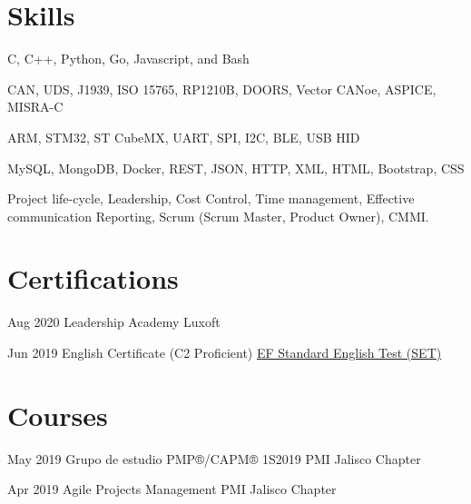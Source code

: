 \documentclass[10pt, letterpaper]{article} %
\begin{document}

\section{Skills}

{C, C++, Python, Go, Javascript, and Bash}
{}


{CAN, UDS, J1939, ISO 15765, RP1210B, DOORS, Vector CANoe, ASPICE, MISRA-C}
{}


{ARM, STM32, ST CubeMX, UART, SPI, I2C, BLE, USB HID}
{}

{MySQL, MongoDB, Docker, REST, JSON, HTTP, XML, HTML, Bootstrap, CSS}
{}

{Project life-cycle, Leadership, Cost Control, Time management, Effective communication}
{Reporting, Scrum (Scrum Master, Product Owner), CMMI. }



\section{Certifications}

\dateitem
{Aug 2020}
{Leadership Academy}
{Luxoft}

\dateitem
{Jun 2019}
{English Certificate (C2 Proficient)}
{\href{https://www.efset.org/cert/BAUjza}{EF Standard English Test (SET)}}


\section{Courses}

\dateitem
{May 2019}
{Grupo de estudio PMP®/CAPM® 1S2019}
{PMI Jalisco Chapter}

\dateitem
{Apr 2019}
{Agile Projects Management}
{PMI Jalisco Chapter}
\end{document}
